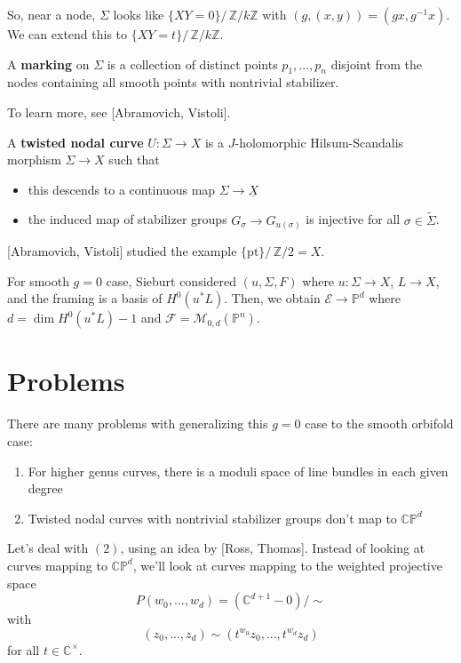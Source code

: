 So, near a node, $\Sigma$ looks like $\{XY=0\}/\,\mathbb{Z}/k\mathbb{Z}$ with $(g,(x,y))=(gx,g^{-1}x)$. We can extend this to $\{XY=t\}/ \, \mathbb{Z}/k\mathbb{Z}$.

\begin{definition}

A \textbf{marking} on $\Sigma$ is a collection of distinct points $p_1,...,p_n$ disjoint from the nodes containing all smooth points with nontrivial stabilizer.

\end{definition}

To learn more, see [Abramovich, Vistoli].

\begin{definition}

A \textbf{twisted nodal curve} $U:\Sigma \to X$ is a $J$-holomorphic Hilsum-Scandalis morphism $\Sigma \to X$ such that
\begin{itemize}
\item this descends to a continuous map $\Sigma \to \underline{X}$
\item the induced map of stabilizer groups $G_\sigma\to G_{u(\sigma)}$ is injective for all $\sigma \in \tilde{\Sigma}$.
\end{itemize}

\end{definition}

[Abramovich, Vistoli] studied the example $\{\text{pt}\}/\,\mathbb{Z}/2=X$.

For smooth $g=0$ case, Sieburt considered $(u, \Sigma, F)$ where $u: \Sigma \to X$, $L\to X$, and the framing is a basis of $H^0(u^*L)$. Then, we obtain $\mathcal{E}\to \mathbb{P}^d$ where $d=\dim H^0(u^*L)-1$ and $\mathcal{F}=\mathcal{M}_{0,d}(\mathbb{P}^n)$.

\section{Problems}

There are many problems with generalizing this $g=0$ case to the smooth orbifold case:
\begin{enumerate}
\item For higher genus curves, there is a moduli space of line bundles in each given degree
\item Twisted nodal curves with nontrivial stabilizer groups don't map to $\mathbb{CP}^d$
\end{enumerate}

Let's deal with $(2)$, using an idea by [Ross, Thomas]. Instead of looking at curves mapping to $\mathbb{CP}^d$, we'll look at curves mapping to the weighted projective space
\[
P(w_0,...,w_d) = \left( \mathbb{C}^{d+1}- 0\right)/\sim
\]
with
\[
(z_0, ...,z_d)\sim (t^{w_0}z_0, ..., t^{w_d}z_d)
\]
for all $t\in \mathbb{C}^\times$.

